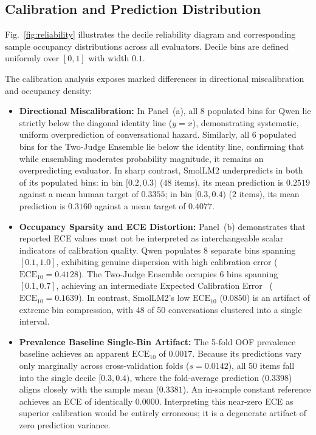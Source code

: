 \subsection{Calibration and Prediction Distribution}
\label{subsec:calibration}

Fig.~\ref{fig:reliability} illustrates the decile reliability diagram and corresponding sample occupancy distributions across all evaluators. Decile bins are defined uniformly over $[0, 1]$ with width $0.1$. 

The calibration analysis exposes marked differences in directional miscalibration and occupancy density:
\begin{itemize}
    \item \textbf{Directional Miscalibration:} In Panel~(a), all 8 populated bins for Qwen lie strictly below the diagonal identity line ($y=x$), demonstrating systematic, uniform overprediction of conversational hazard. Similarly, all 6 populated bins for the Two-Judge Ensemble lie below the identity line, confirming that while ensembling moderates probability magnitude, it remains an overpredicting evaluator. In sharp contrast, SmolLM2 underpredicts in both of its populated bins: in bin $[0.2, 0.3)$ ($48$ items), its mean prediction is $0.2519$ against a mean human target of $0.3355$; in bin $[0.3, 0.4)$ ($2$ items), its mean prediction is $0.3160$ against a mean target of $0.4077$.
    \item \textbf{Occupancy Sparsity and ECE Distortion:} Panel~(b) demonstrates that reported ECE values must not be interpreted as interchangeable scalar indicators of calibration quality. Qwen populates 8 separate bins spanning $[0.1, 1.0]$, exhibiting genuine dispersion with high calibration error ($\text{ECE}_{10}=0.4128$). The Two-Judge Ensemble occupies 6 bins spanning $[0.1, 0.7]$, achieving an intermediate Expected Calibration Error~\cite{guo2017calibration} ($\text{ECE}_{10}=0.1639$). In contrast, SmolLM2's low $\text{ECE}_{10}$ ($0.0850$) is an artifact of extreme bin compression, with 48 of 50 conversations clustered into a single interval.
    \item \textbf{Prevalence Baseline Single-Bin Artifact:} The 5-fold OOF prevalence baseline achieves an apparent $\text{ECE}_{10}$ of $0.0017$. Because its predictions vary only marginally across cross-validation folds ($s=0.0142$), all 50 items fall into the single decile $[0.3, 0.4)$, where the fold-average prediction ($0.3398$) aligns closely with the sample mean ($0.3381$). An in-sample constant reference achieves an ECE of identically $0.0000$. Interpreting this near-zero ECE as superior calibration would be entirely erroneous; it is a degenerate artifact of zero prediction variance.
\end{itemize}

